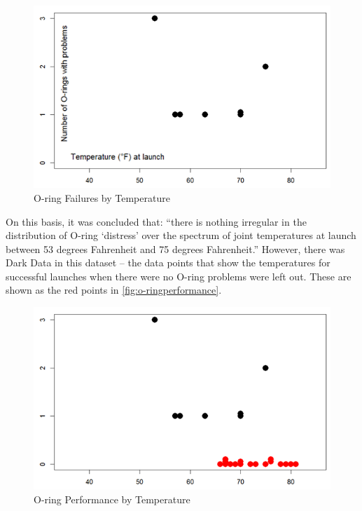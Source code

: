 \begin{figure}[htbp]
  \centering
  \includegraphics[width=\textwidth/2]{images/darkfailures}
  \caption{O-ring Failures by Temperature}
  \label{fig:o-ringfailures}
\end{figure}

On this basis, it was concluded that: 
``there is nothing irregular in the distribution of O-ring ‘distress’ over the spectrum of joint temperatures at launch between 53 degrees Fahrenheit and 75 degrees Fahrenheit.''
However, there was Dark Data in this \gls{dataset} -- the data points that show the temperatures for successful launches when there were no O-ring problems were left out. These are shown as the red points in \autoref{fig:o-ringperformance}.

\begin{figure}[htbp]
  \centering
  \includegraphics[width=\textwidth/2]{images/darkperformance}
  \caption{O-ring Performance by Temperature}
  \label{fig:o-ringperformance}
\end{figure}

